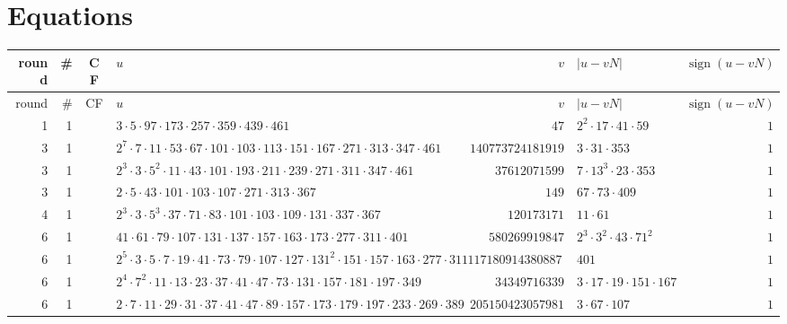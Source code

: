 \documentclass[a4paper,twoside,10pt]{report}
\DeclareMathOperator{\sign}{\text{sign}}
\renewcommand{\checkmark}{\text{\ding{51}}}
\newcommand{\cross}{\text{\ding{55}}}
\begin{document}
\section*{Equations}
\begin{longtable}{rrcp{5cm}rp{5cm}r}
\toprule
round & \# & CF & $u$ & $v$ & $|u-vN|$ & $\sign(u-vN)$\\\midrule
\endfirsthead
\toprule
round & \# & CF & $u$ & $v$ & $|u-vN|$ & $\sign(u-vN)$\\\midrule
\endhead
1 & 1 & \cross& $3 \cdot 5 \cdot 97 \cdot 173 \cdot 257 \cdot 359 \cdot 439 \cdot 461$ & $47$ & $2^{2} \cdot 17 \cdot 41 \cdot 59$ & $1$\\
3 & 1 & \checkmark& $2^{7} \cdot 7 \cdot 11 \cdot 53 \cdot 67 \cdot 101 \cdot 103 \cdot 113 \cdot 151 \cdot 167 \cdot 271 \cdot 313 \cdot 347 \cdot 461$ & $140773724181919$ & $3 \cdot 31 \cdot 353$ & $1$\\
3 & 1 & \checkmark& $2^{3} \cdot 3 \cdot 5^{2} \cdot 11 \cdot 43 \cdot 101 \cdot 193 \cdot 211 \cdot 239 \cdot 271 \cdot 311 \cdot 347 \cdot 461$ & $37612071599$ & $7 \cdot 13^{3} \cdot 23 \cdot 353$ & $1$\\
3 & 1 & \cross& $2 \cdot 5 \cdot 43 \cdot 101 \cdot 103 \cdot 107 \cdot 271 \cdot 313 \cdot 367$ & $149$ & $67 \cdot 73 \cdot 409$ & $1$\\
4 & 1 & \checkmark& $2^{3} \cdot 3 \cdot 5^{3} \cdot 37 \cdot 71 \cdot 83 \cdot 101 \cdot 103 \cdot 109 \cdot 131 \cdot 337 \cdot 367$ & $120173171$ & $11 \cdot 61$ & $1$\\
6 & 1 & \checkmark& $41 \cdot 61 \cdot 79 \cdot 107 \cdot 131 \cdot 137 \cdot 157 \cdot 163 \cdot 173 \cdot 277 \cdot 311 \cdot 401$ & $580269919847$ & $2^{3} \cdot 3^{2} \cdot 43 \cdot 71^{2}$ & $1$\\
6 & 1 & \checkmark& $2^{5} \cdot 3 \cdot 5 \cdot 7 \cdot 19 \cdot 41 \cdot 73 \cdot 79 \cdot 107 \cdot 127 \cdot 131^{2} \cdot 151 \cdot 157 \cdot 163 \cdot 277 \cdot 311$ & $11718091438088741$ & $401$ & $1$\\
6 & 1 & \checkmark& $2^{4} \cdot 7^{2} \cdot 11 \cdot 13 \cdot 23 \cdot 37 \cdot 41 \cdot 47 \cdot 73 \cdot 131 \cdot 157 \cdot 181 \cdot 197 \cdot 349$ & $34349716339$ & $3 \cdot 17 \cdot 19 \cdot 151 \cdot 167$ & $1$\\
6 & 1 & \checkmark& $2 \cdot 7 \cdot 11 \cdot 29 \cdot 31 \cdot 37 \cdot 41 \cdot 47 \cdot 89 \cdot 157 \cdot 173 \cdot 179 \cdot 197 \cdot 233 \cdot 269 \cdot 389$ & $205150423057981$ & $3 \cdot 67 \cdot 107$ & $1$\\

\end{longtable}
\end{document}
